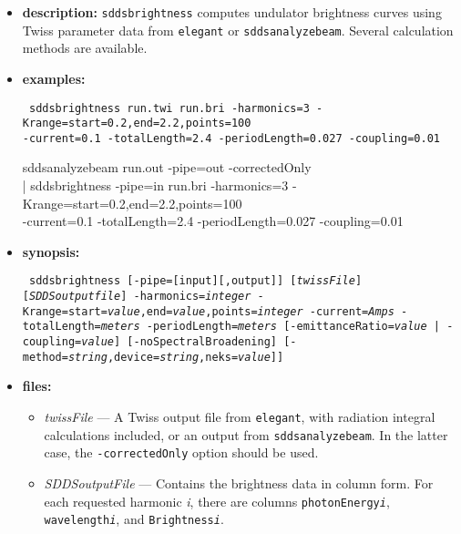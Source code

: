 \documentclass[11pt]{article}
\begin{document}
\begin{itemize}
\item {\bf description:} {\tt sddsbrightness} computes undulator brightness curves using
Twiss parameter data from {\tt elegant} or {\tt sddsanalyzebeam}. Several calculation
methods are available.

\item {\bf examples:}
\begin{flushleft}{\tt
sddsbrightness run.twi run.bri -harmonics=3 -Krange=start=0.2,end=2.2,points=100 \\
  -current=0.1 -totalLength=2.4 -periodLength=0.027 -coupling=0.01

sddsanalyzebeam run.out -pipe=out -correctedOnly \\ 
 | sddsbrightness -pipe=in run.bri -harmonics=3 -Krange=start=0.2,end=2.2,points=100 \\
  -current=0.1 -totalLength=2.4 -periodLength=0.027 -coupling=0.01
}\end{flushleft}

\item {\bf synopsis:}
\begin{flushleft}{\tt
sddsbrightness [-pipe=[input][,output]] [{\em twissFile}] [{\em SDDSoutputfile}]
 -harmonics={\em integer} -Krange=start={\em value},end={\em value},points={\em integer}
 -current={\em Amps} -totalLength={\em meters} -periodLength={\em meters}
 [-emittanceRatio={\em value} | -coupling={\em value}] [-noSpectralBroadening]
 [-method={\em string},device={\em string},neks={\em value}]] 
}\end{flushleft}

\item {\bf files:}
\begin{itemize}
\item {\em twissFile} --- A Twiss output file from {\tt elegant}, with radiation integral 
calculations included, or an output from {\tt sddsanalyzebeam}. In the latter case, the
{\tt -correctedOnly} option should be used.
\item {\em SDDSoutputFile} --- Contains the brightness data in column form.  For each 
requested harmonic {\em i}, there are columns {\tt photonEnergy{\em i}}, {\tt wavelength{\em i}},
and {\tt Brightness{\em i}}.
\end{itemize}


\end{itemize}
\end{document}
